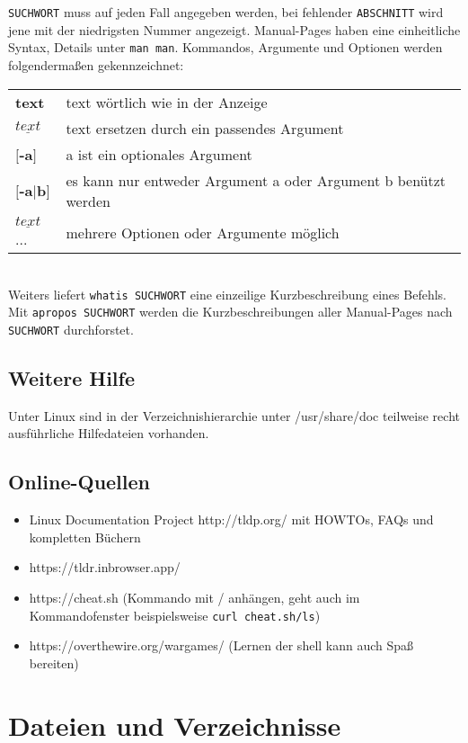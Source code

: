 \documentclass[11pt]{article}
\begin{document}
\texttt{SUCHWORT} muss auf jeden Fall angegeben werden, bei fehlender
\texttt{ABSCHNITT} wird jene mit der niedrigsten Nummer angezeigt.
Manual-Pages haben eine einheitliche Syntax, Details unter \texttt{man
man}. Kommandos, Argumente und Optionen werden folgendermaßen gekennzeichnet:

\begin{tabular}{ll}
\textbf{text} & text wörtlich wie in der Anzeige \\
$ \underline{text}$ & text ersetzen durch ein passendes Argument \\
$[$\textbf{-a}$]$ & a ist ein optionales Argument \\
$[$\textbf{-a$|$b}$]$ & es kann nur entweder Argument a oder Argument b benützt
werden \\
$ \underline{text}$... &  mehrere Optionen oder Argumente möglich\\
\end{tabular} \\

Weiters liefert \texttt{whatis SUCHWORT} eine einzeilige
Kurzbeschreibung eines Befehls.  Mit \texttt{apropos SUCHWORT} werden
die Kurzbeschreibungen aller Manual-Pages nach \texttt{SUCHWORT}
durchforstet.

\subsection{Weitere Hilfe}
Unter Linux sind in der Verzeichnishierarchie unter /usr/share/doc
teilweise recht ausführliche Hilfedateien vorhanden. 

\subsection{Online-Quellen}
\begin{itemize}
\item Linux Documentation Project http://tldp.org/ mit HOWTOs, FAQs und kompletten Büchern

\item https://tldr.inbrowser.app/
\item https://cheat.sh (Kommando mit / anhängen, geht auch im Kommandofenster beispielsweise \texttt{curl cheat.sh/ls})
\item https://overthewire.org/wargames/ (Lernen der shell kann auch Spaß bereiten)
\end{itemize}


\section{Dateien und Verzeichnisse}
\end{document}
